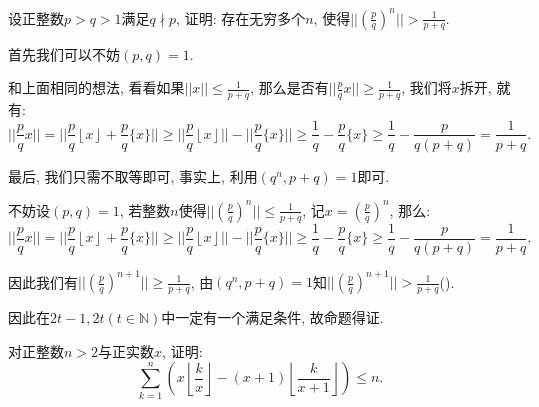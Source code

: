 \documentclass[lang=cn,12pt,thmcnt=section]{elegantbook}
\newcommand{\fl}[1]{\left\lfloor #1\right\rfloor}
\renewcommand{\note}[1]{({\kaishu\dashuline{#1}})}
\begin{document}
\begin{example}
设正整数$p>q>1$满足$q\nmid p$, 证明: 存在无穷多个$n$, 使得$||\left(\frac{p}{q}\right)^n||>\frac{1}{p+q}$.
\end{example}

\begin{analysis}
首先我们可以不妨$(p,q)=1$.

和上面相同的想法, 看看如果$||x||\le \frac{1}{p+q}$, 那么是否有$||\frac{p}{q}x||\ge \frac{1}{p+q}$, 我们将$x$拆开, 就有: 
\[
||\frac{p}{q}x||= ||\frac{p}{q}\fl{x}+\frac{p}{q}\{x\}||\ge ||\frac{p}{q}\fl{x}||-||\frac{p}{q}\{x\}||\ge \frac{1}{q}-\frac{p}{q}\{x\}\ge \frac{1}{q}-\frac{p}{q(p+q)}=\frac{1}{p+q}.
\]

最后, 我们只需不取等即可, 事实上, 利用$(q^n,p+q)=1$即可.
\end{analysis}

\begin{solution}
不妨设$(p,q)=1$, 若整数$n$使得$||\left(\frac{p}{q}\right)^n||\le \frac{1}{p+q}$, 记$x=\left(\frac{p}{q}\right)^n$, 那么: 
\[
||\frac{p}{q}x||= ||\frac{p}{q}\fl{x}+\frac{p}{q}\{x\}||\ge ||\frac{p}{q}\fl{x}||-||\frac{p}{q}\{x\}||\ge \frac{1}{q}-\frac{p}{q}\{x\}\ge \frac{1}{q}-\frac{p}{q(p+q)}=\frac{1}{p+q},
\]

因此我们有$||\left(\frac{p}{q}\right)^{n+1}||\ge \frac{1}{p+q}$, 由$(q^n,p+q)=1$知$||\left(\frac{p}{q}\right)^{n+1}||> \frac{1}{p+q}$\note{因为最简分母一定不同}.

因此在$2t-1,2t(t\in \mathbb{N})$中一定有一个满足条件, 故命题得证.
\end{solution}


\begin{example}
对正整数$n>2$与正实数$x$, 证明: 
\[
\sum_{k=1}^n \left(x\fl{\frac{k}{x}}-(x+1)\fl{\frac{k}{x+1}}\right)\le n.
\]
\end{example}
\end{document}
